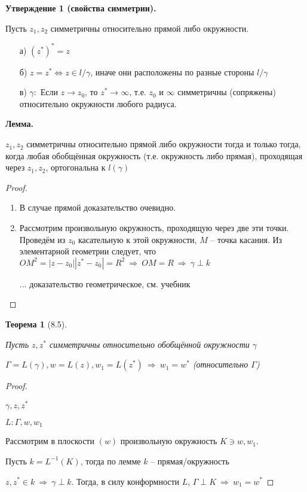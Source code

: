 \documentclass[draft]{report}
\newcommand{\forcenewline}{$\phantom{\mbox{newline}}$\newline}
\newcommand{\then}{\ \Rightarrow\ }
\newcommand{\LRA}{\Leftrightarrow}
\newcommand{\g}{\gamma}
\newtheorem*{theor}{Теорема}
\theoremstyle{remark}
\begin{document}
{\bfseries Утверждение 1 (свойства симметрии).}

Пусть $z_1, z_2$ симметричны относительно прямой либо окружности.
\begin{enumerate}
\item[а)] $(z^*)^*=z$
\item[б)] $z=z^* \LRA z\in l/\g$, иначе они расположены по разные стороны $l/\g$
\item[в)] $\g\colon$ Если $z\to z_0$, то $z^*\to\infty$, т.е. $z_0$ и $\infty$ симметричны (сопряжены) относительно окружности любого радиуса.
\end{enumerate}

{\bfseries Лемма.}

$z_1, z_2$ симметричны относительно прямой либо окружности тогда и только тогда, когда любая обобщённая окружность (т.е. окружность либо прямая), проходящая через $z_1, z_2$, ортогональна к $l(\g)$
\begin{proof}
\forcenewline
\begin{enumerate}
\item В случае прямой доказательство очевидно.
\item Рассмотрим произвольную окружность, проходящую через две эти точки. Проведём из $z_0$ касательную к этой окружности, $M$ -- точка касания. Из элементарной геометрии следует, что $OM^2=|z-z_0||z^*-z_0|=R^2 \then OM=R \then \g\perp k$

... доказательство геометрическое, см. учебник
\end{enumerate}
\end{proof}

\begin{theor}[8.5]
\forcenewline

Пусть $z,z^*$ симметричны относительно обобщённой окружности $\g$

$\Gamma=L(\g), w=L(z), w_1=L(z^*) \then w_1=w^*$ (относительно $\Gamma$)
\end{theor}

\begin{proof}
\forcenewline

$\g,z,z^*$

$L\colon \Gamma,w,w_1$

Рассмотрим в плоскости $(w)$ произвольную окружность $K\ni w,w_1$.

Пусть $k=L^{-1}(K)$, тогда по лемме $k$ -- прямая/окружность

$z,z^*\in k\then \g\perp k$. Тогда, в силу конформности $L$, $\Gamma\perp K \then w_1=w^*$
\end{proof}
\end{document}
